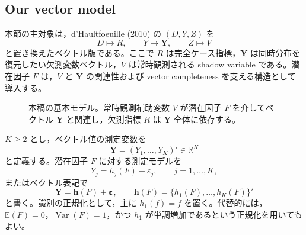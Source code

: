 \documentclass[10pt,a4paper]{article}
\newcommand{\indep}{\mathrel{\perp\!\!\!\perp}}
\newcommand{\E}{\mathbb{E}}
\newcommand{\R}{\mathbb{R}}
\newcommand{\1}{\mathbf{1}}
\newcommand{\Y}{\bm{Y}}
\newcommand{\eps}{\bm{\varepsilon}}
\begin{document}
\subsection{Our vector model}

本節の主対象は，d'Haultfoeuille (2010) の $(D,Y,Z)$ を
\begin{equation}
  D\mapsto R,\qquad
  Y\mapsto \Y,\qquad
  Z\mapsto V
  \label{eq:dh-to-vector-map}
\end{equation}
と置き換えたベクトル版である。ここで $R$ は完全ケース指標，$\Y$ は同時分布を復元したい欠測変数ベクトル，$V$ は常時観測される shadow variable である。潜在因子 $F$ は，$V$ と $\Y$ の関連性および vector completeness を支える構造として導入する。

\begin{figure}[tbp]
\centering
{}
\caption{本稿の基本モデル。常時観測補助変数 $V$ が潜在因子 $F$ を介してベクトル $\Y$ と関連し，欠測指標 $R$ は $\Y$ 全体に依存する。}
\label{fig:dag-vector-basic}
\end{figure}

$K\geq 2$ とし，ベクトル値の測定変数を
\begin{equation}
  \Y=(Y_1,\ldots,Y_K)'\in\R^K
\end{equation}
と定義する。潜在因子 $F$ に対する測定モデルを
\begin{equation}
  Y_j=h_j(F)+\varepsilon_j,
  \qquad j=1,\ldots,K,
  \label{eq:vector-measurement}
\end{equation}
またはベクトル表記で
\begin{equation}
  \Y=\bm h(F)+\eps,
  \qquad \bm h(F)=\{h_1(F),\ldots,h_K(F)\}'
  \label{eq:vector-measurement-compact}
\end{equation}
と書く。識別の正規化として，主に $h_1(f)=f$ を置く。代替的には，$\E(F)=0$，$\operatorname{Var}(F)=1$，かつ $h_1$ が単調増加であるという正規化を用いてもよい。
\end{document}
